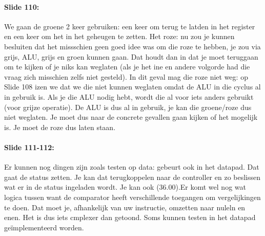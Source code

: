 \documentclass[10pt,a4paper]{book}
\begin{document}
\paragraph{Slide 110:}  We gaan de groene 2 keer gebruiken: een keer om terug te latden in het register en een keer om het in het geheugen te zetten. Het roze: nu zou je kunnen besluiten dat het missschien geen goed idee was om die roze te hebben, je zou via grijs, ALU, grijs en groen kunnen gaan. Dat houdt dan in dat je moet teruggaan om te kijken of je niks kan weglaten (als je het ine en andere volgorde had die vraag zich misschien zelfs niet gesteld). In dit geval mag die roze niet weg: op Slide 108 izen we dat we die niet kunnen weglaten omdat de ALU in die cyclus al in gebruik is. Als je die ALU nodig hebt, wordt die al voor iets anders gebruikt (voor grijze operatie). De ALU is dus al in gebruik, je kan die groene/roze dus niet weglaten. Je moet dus naar de concrete gevallen gaan kijken of het mogelijk is. Je moet de roze dus laten staan.

\paragraph{Slide 111-112:} Er kunnen nog dingen zijn zoals testen op data: gebeurt ook in het datapad. Dat gaat de status zetten. Je kan dat terugkoppelen naar de controller en zo beslissen wat er in de status ingeladen wordt. Je kan ook (36.00).Er komt wel nog wat logica tussen want de comparator heeft verschillende toegangen om vergelijkingen te doen. Dat moet je, afhankelijk van uw instructie, omzetten naar nuleln en enen. Het is dus iets cmplexer dan getoond. Soms kunnen testen in het datapad ge\"implementeerd worden.
\end{document}
